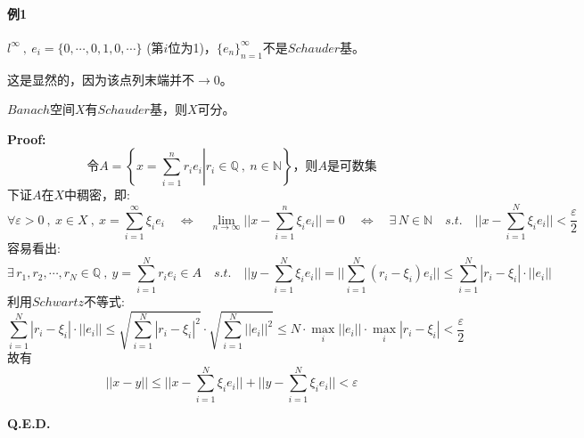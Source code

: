 \paragraph*{例1} \quad $l^{\infty} \ , \ e_i=\{0,\cdots,0,1,0,\cdots\}$ (第$i$位为1)，$\{e_n\}_{n=1}^{\infty}$不是$Schauder$基。

这是显然的，因为该点列末端并不$\to 0$。
\begin{theorem}
    $Banach$空间$X$有$Schauder$基，则$X$可分。
\end{theorem}
\textbf{Proof:}
\[\text{令}A=\left\{\left.x=\sum_{i=1}^nr_ie_i\right|r_i \in \mathbb{Q} \ , \ n \in \mathbb{N}\right\}\text{，则$A$是可数集}\]
下证$A$在$X$中稠密，即:
\[\forall \varepsilon>0 \ , \ x \in X \ , \ x=\sum_{i=1}^{\infty}\xi_ie_i \quad \Leftrightarrow \quad \lim_{n \to \infty}||x-\sum_{i=1}^n\xi_ie_i||=0 \quad \Leftrightarrow \quad \exists \, N \in \mathbb{N} \quad s.t. \quad ||x-\sum_{i=1}^N\xi_ie_i||<\frac{\varepsilon}{2}\]
容易看出:
\[\exists \, r_1,r_2,\cdots,r_N \in \mathbb{Q} \ , \ y=\sum_{i=1}^Nr_ie_i \in A \quad s.t. \quad ||y-\sum_{i=1}^N\xi_ie_i||=||\sum_{i=1}^N(r_i-\xi_i)e_i|| \leq \sum_{i=1}^N|r_i-\xi_i|\cdot||e_i||\]
利用$Schwartz$不等式:
\[\sum_{i=1}^N|r_i-\xi_i|\cdot||e_i|| \leq \sqrt{\sum_{i=1}^N|r_i-\xi_i|^2} \cdot \sqrt{\sum_{i=1}^N||e_i||^2} \leq N \cdot \mathop \text{max}\limits_i||e_i|| \cdot \mathop \text{max}\limits_i|r_i-\xi_i|<\frac{\varepsilon}{2}\]
故有
\[||x-y|| \leq ||x-\sum_{i=1}^N\xi_ie_i||+||y-\sum_{i=1}^N\xi_ie_i||<\varepsilon\]

\textbf{Q.E.D.}

